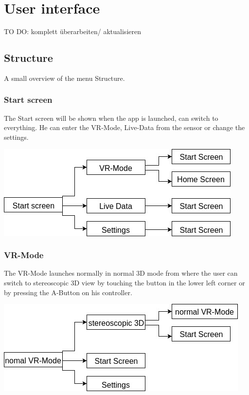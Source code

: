 \section{User interface}

TO DO: komplett überarbeiten/ aktualisieren

\subsection{Structure}

A small overview of the menu Structure.

\subsubsection{Start screen}
The Start screen will be shown when the app is launched, can switch to everything. He can enter the VR-Mode, Live-Data from the sensor or change the settings.

\includegraphics[scale=0.5]{pics/startscreen.jpg}

\subsubsection{VR-Mode}

The VR-Mode launches normally in normal 3D mode from where the user can switch to stereoscopic 3D view by touching the button in the lower left corner or by pressing the A-Button on his controller.

\includegraphics[scale=0.5]{pics/Vr-Mode.jpg}



